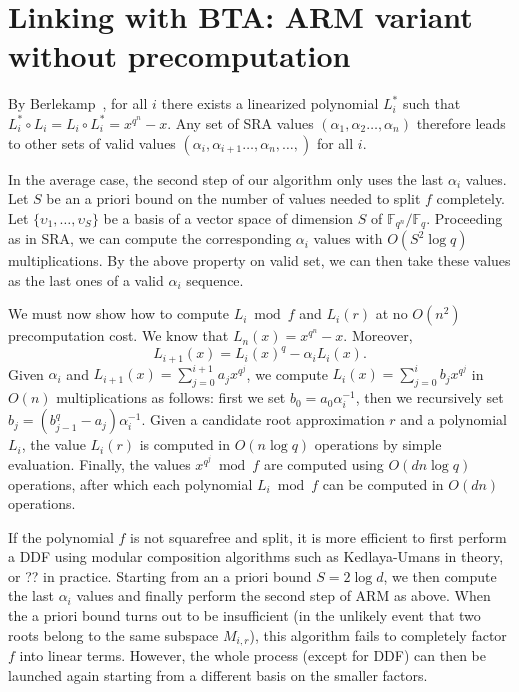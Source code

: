 \documentclass{sig-alternate}
\newcommand{\ff}[1]{\mathbb{F}_{#1}}
\newcommand{\fq}{\ff{q}}
\newcommand{\fqn}{\ff{q^n}}
\newcommand{\qq}{q}
\newcounter{algo}
\begin{document}
\section{Linking with BTA: ARM variant without precomputation}

By Berlekamp~\cite[Theorem..]{}, for all $i$ there exists a linearized polynomial $L_i^*$ such that $L_i^*\circ L_i=L_i\circ L_i^*=x^{q^n}-x$. Any set of SRA values $(\alpha_{1},\alpha_2\ldots,\alpha_{n})$ therefore leads to other sets of valid values $(\alpha_{i},\alpha_{i+1}\ldots,\alpha_{n},\ldots,)$ for all $i$.

In the average case, the second step of our algorithm only uses the last $\alpha_i$ values. Let $S$ be an a priori bound on the number of values needed to split $f$ completely. Let $\{\upsilon_1,\ldots,\upsilon_S\}$ be a basis of a vector space of dimension $S$ of $\fqn/\fq$. Proceeding as in SRA, we can compute the corresponding $\alpha_i$ values with $O(S^2\log\qq)$ multiplications. By the above property on valid set, we can then take these values as the last ones of a valid $\alpha_i$ sequence.

We must now show how to compute $L_i\bmod f$ and $L_i(r)$ at no $O(n^2)$ precomputation cost. We know that $L_n(x)=x^{q^n}-x$. Moreover,
$$L_{i+1}(x)=L_i(x)^q-\alpha_iL_i(x).$$
Given $\alpha_i$ and $L_{i+1}(x)=\sum_{j=0}^{i+1}a_jx^{q^j}$, we compute $L_i(x)=\sum_{j=0}^{i}b_jx^{q^j}$ in $O(n)$ multiplications as follows: first we set $b_0=a_0\alpha_i^{-1}$, then we recursively set $b_j=(b_{j-1}^q-a_j)\alpha_i^{-1}$.
%
Given a candidate root approximation $r$ and a polynomial $L_i$, the value $L_i(r)$ is computed in $O(n\log q)$ operations by simple evaluation. 
%
Finally, the values $x^{q^j}\bmod f$ are computed using $O(dn\log q)$ operations, after which each polynomial
$L_i\bmod f$ can be computed in $O(dn)$ operations.

If the polynomial $f$ is not squarefree and split, it is more efficient to first perform a DDF using modular composition algorithms such as Kedlaya-Umans in theory, or ?? in practice. Starting from an a priori bound $S=2\log d$, we then compute the last $\alpha_i$ values and finally perform the second step of ARM as above.
%
When the a priori bound turns out to be insufficient (in the unlikely event that two roots belong to the same subspace $M_{i,r}$), this algorithm fails to completely factor $f$ into linear terms. However, the whole process (except for DDF) can then be launched again starting from a different basis on the smaller factors.
\end{document}
